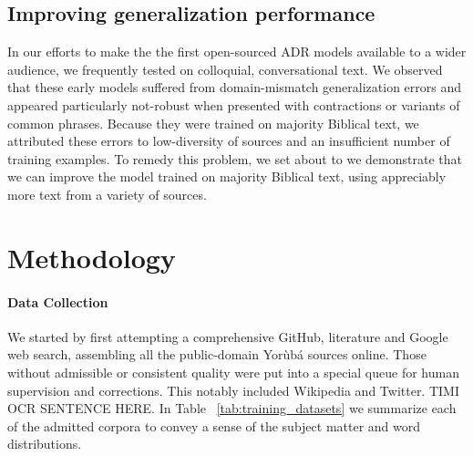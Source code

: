 \documentclass{article} %
\begin{document}

\subsection{Improving generalization performance}

In our efforts to make the the first open-sourced ADR models available to a wider audience, we frequently tested on colloquial, conversational text. We observed that these early models suffered from domain-mismatch generalization errors and appeared particularly not-robust when presented with contractions or variants of common phrases. Because they were trained on majority Biblical text, we attributed these errors to low-diversity of sources and an insufficient number of training examples. To remedy this problem,  we set about to  we demonstrate that we can improve the model trained on majority Biblical text, using appreciably more text from a variety of sources.

\section{Methodology}\label{sec:methods}

\paragraph{Data Collection}\label{sec:collection}
We started by first attempting a comprehensive GitHub, literature and Google web search, assembling all the public-domain Yor{\`u}b{\'a} sources online. Those without admissible or consistent quality were put into a special queue for human supervision and corrections. This notably included Wikipedia and Twitter. TIMI OCR SENTENCE HERE. In Table ~\ref{tab:training_datasets} we summarize each of the admitted corpora to convey a sense of the subject matter and word distributions. 


\end{document}

